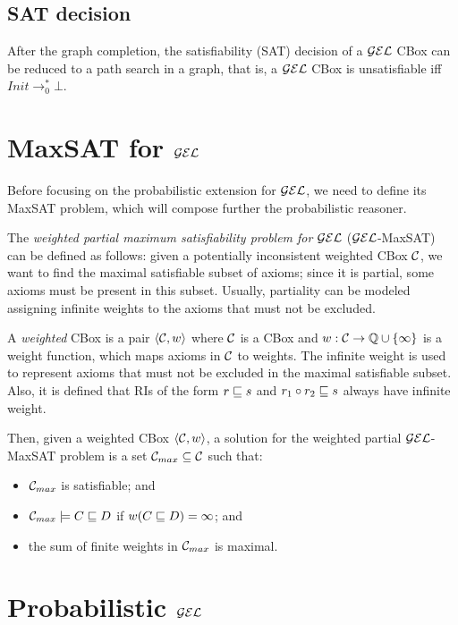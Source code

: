 \subsection{SAT decision}


After the graph completion, the satisfiability (SAT) decision of a $\mathcal{GEL}$ CBox can be reduced to a path search in a graph, that is, a $\mathcal{GEL}$ CBox is unsatisfiable iff $Init \to_0^* \bot$. 

\section{MaxSAT for \texorpdfstring{$\mathcal{GEL}$}{𝓖𝓔𝓛}}
\label{sec:maxgel}

Before focusing on the probabilistic extension for $\mathcal{GEL}$, we need to define its MaxSAT problem, which will compose further the probabilistic reasoner.

The \emph{weighted partial maximum satisfiability problem for} $\mathcal{GEL}$ ($\mathcal{GEL}$-MaxSAT) can be defined as follows: given a potentially inconsistent weighted CBox $\mathcal{C}$, we want to find the maximal satisfiable subset of axioms; since it is partial, some axioms must be present in this subset. Usually, partiality can be modeled assigning infinite weights to the axioms that must not be excluded.

A \emph{weighted} CBox is a pair $\langle\mathcal{C}, w\rangle$ where $\mathcal{C}$ is a CBox and $w: \mathcal{C} \to \mathbb{Q} \cup \{\infty\}$ is a weight function, which maps axioms in $\mathcal{C}$ to weights. The infinite weight is used to represent axioms that must not be excluded in the maximal satisfiable subset. Also, it is defined that RIs of the form $r \sqsubseteq s$ and $r_1 \circ r_2 \sqsubseteq s$ always have infinite weight.

Then, given a weighted CBox $\langle\mathcal{C}, w\rangle$, a solution for the weighted partial $\mathcal{GEL}$-MaxSAT problem is a set $\mathcal{C}_{max} \subseteq \mathcal{C}$ such that:
\begin{itemize}
	\item $\mathcal{C}_{max}$ is satisfiable; and
	\item $\mathcal{C}_{max} \models C \sqsubseteq D$ if $w(C \sqsubseteq D) = \infty$; and
	\item the sum of finite weights in $\mathcal{C}_{max}$ is maximal.
\end{itemize}

\section{Probabilistic \texorpdfstring{$\mathcal{GEL}$}{𝓖𝓔𝓛}}
\label{sec:pgel}

